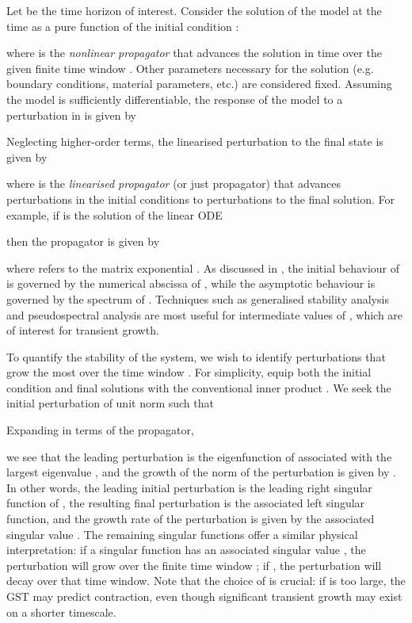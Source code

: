 \documentclass{siamltex}
\begin{document}
Let  be the time horizon of interest. Consider the solution of the model at the time  as a pure function of the initial condition :

where  is the \emph{nonlinear propagator} that advances the solution in time over the given finite time window .
Other parameters necessary for the solution (e.g. boundary conditions, material parameters, etc.)
are considered fixed. Assuming the model is sufficiently differentiable, the response of the 
model  to a perturbation  in  is given by

Neglecting higher-order terms, the linearised perturbation to the final state is given by

where  is the \emph{linearised propagator} (or just propagator) 
that advances perturbations in the initial conditions to perturbations to the final solution. For example, if  is the solution
of the linear ODE

then the propagator  is given by

where  refers to the matrix exponential \cite{moler2003}. As discussed in \cite[figure 14.1]{trefethen2006}, 
the initial behaviour of  is governed by the numerical abscissa of , while the asymptotic behaviour is governed by the spectrum of . 
Techniques such as generalised stability analysis and pseudospectral analysis are most useful for intermediate values of , which are of interest for transient growth.

To quantify the stability of the system, we wish to identify perturbations  that grow the most over the time window .
For simplicity, equip both the initial condition and final solutions with the conventional inner product .
We seek the initial perturbation  of unit norm 
such that

Expanding  in terms of the propagator,

we see that the leading perturbation is the eigenfunction of  associated with the largest eigenvalue , and the growth of the norm of the perturbation is given
by . In other words, the leading initial perturbation  is the leading right singular function of , the resulting final perturbation 
is the associated left singular function, and the growth rate of the perturbation is given by the associated singular value . The remaining singular functions
offer a similar physical interpretation: if a singular function  has an associated singular value , the perturbation will grow over the finite time window ; if ,
the perturbation will decay over that time window. Note that the choice of  is crucial: if  is too large, the GST may predict contraction, even though significant transient growth may exist on
a shorter timescale.
\end{document}

